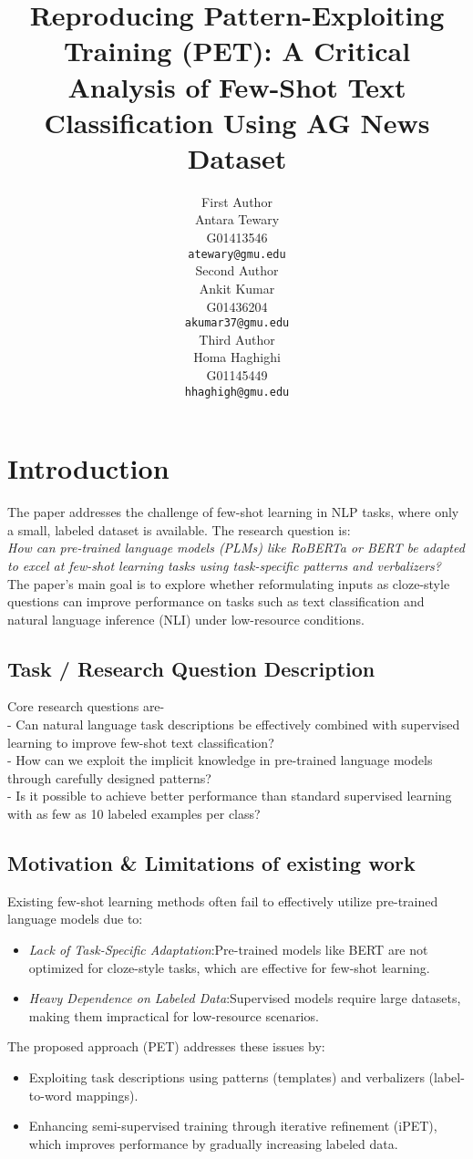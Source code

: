 \documentclass[11pt,a4paper]{article}
\title{Reproducing Pattern-Exploiting Training (PET): A Critical Analysis of Few-Shot Text Classification Using AG News Dataset}
\author{First Author \\
  Antara Tewary\\ 
  G01413546\\
  \texttt{atewary@gmu.edu} \\\And
  Second Author \\
  Ankit Kumar\\ 
  G01436204\\
  \texttt{akumar37@gmu.edu}\\\And
  Third Author \\
  Homa Haghighi\\ 
  G01145449\\
  \texttt{hhaghigh@gmu.edu}}
\date{}
\begin{document}
\maketitle

\section{Introduction}

The paper addresses the challenge of few-shot learning in NLP tasks, where only a small, labeled dataset is available. The research question is:\\
\textit{How can pre-trained language models (PLMs) like RoBERTa or BERT be adapted to excel at few-shot learning tasks using task-specific patterns and verbalizers? }\\
The paper's main goal is to explore whether reformulating inputs as cloze-style questions can improve performance on tasks such as text classification and natural language inference (NLI) under low-resource conditions. 
            \subsection{Task / Research Question Description} 
            Core research questions are-\\
            - Can natural language task descriptions be effectively combined with supervised learning to improve few-shot text classification?\\
            - How can we exploit the implicit knowledge in pre-trained language models through carefully designed patterns?\\
            - Is it possible to achieve better performance than standard supervised learning with as few as 10 labeled examples per class?
            \subsection{Motivation \& Limitations of existing work} 
            Existing few-shot learning methods often fail to effectively utilize pre-trained language models due to:
            \begin{itemize}[topsep=0pt]
              \item \textit{Lack of Task-Specific Adaptation}:Pre-trained models like BERT are not optimized for cloze-style tasks, which are effective for few-shot learning. 
              \item \textit{Heavy Dependence on Labeled Data}:Supervised models require large datasets, making them impractical for low-resource scenarios.
            \end{itemize} 
            The proposed approach (PET) addresses these issues by:
            \begin{itemize}[topsep=0pt]
              \item Exploiting task descriptions using patterns (templates) and verbalizers (label-to-word mappings). 
              \item Enhancing semi-supervised training through iterative refinement (iPET), which improves performance by gradually increasing labeled data. 
            \end{itemize}
\end{document}
